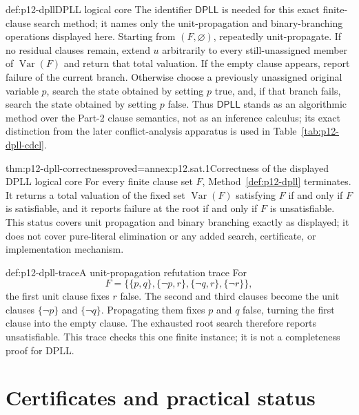 \begin{hbmethod}{def:p12-dpll}{DPLL logical core}
The identifier \(\mathsf{DPLL}\) is needed for this exact finite-clause search
method; it names only the unit-propagation and binary-branching operations
displayed here.  Starting from
\((F,\varnothing)\), repeatedly unit-propagate.  If no residual clauses remain,
extend \(u\) arbitrarily to every still-unassigned member of
\(\operatorname{Var}(F)\) and return that total valuation.  If the empty clause
appears, report failure of the current branch.  Otherwise choose a previously
unassigned original variable \(p\), search the state obtained by setting
\(p\) true, and, if that branch fails, search the state obtained by setting
\(p\) false.  Thus \(\mathsf{DPLL}\) stands as an algorithmic method over the
Part-2 clause semantics, not as an inference calculus; its exact distinction
from the later conflict-analysis apparatus is used in
Table~\ref{tab:p12-dpll-cdcl}.
\end{hbmethod}

\begin{hbtheorem}{thm:p12-dpll-correctness}{proved=annex:p12.sat.1}{Correctness of the displayed DPLL logical core}
For every finite clause set \(F\), Method~\ref{def:p12-dpll} terminates.  It
returns a total valuation of the fixed set \(\operatorname{Var}(F)\) satisfying
\(F\) if and only if \(F\) is satisfiable, and it reports failure at the root if
and only if \(F\) is unsatisfiable.  This status covers unit propagation and
binary branching exactly as displayed; it does not cover pure-literal
elimination or any added search, certificate, or implementation mechanism.
\end{hbtheorem}

\begin{hbexample}{def:p12-dpll-trace}{A unit-propagation refutation trace}
For
\[
 F=\bigl\{\{p,q\},\{\neg p,r\},\{\neg q,r\},\{\neg r\}\bigr\},
\]
the first unit clause fixes \(r\) false.  The second and third clauses become
the unit clauses \(\{\neg p\}\) and \(\{\neg q\}\).  Propagating them fixes
\(p\) and \(q\) false, turning the first clause into the empty clause.  The
exhausted root search therefore reports unsatisfiable.  This trace checks this
one finite instance; it is not a completeness proof for DPLL.
\end{hbexample}

\section{Certificates and practical status}


